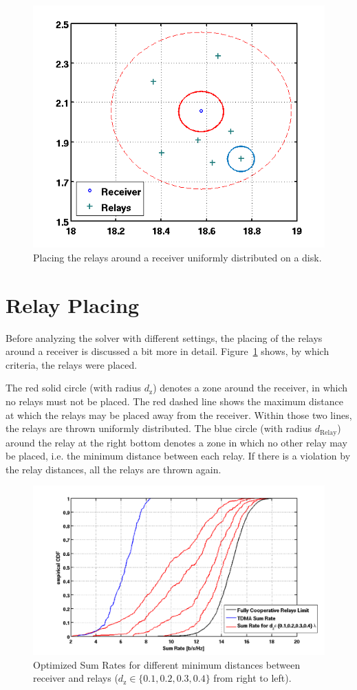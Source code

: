 \begin{figure}[h]
\centering
  \includegraphics[width=0.6\linewidth]{images/cloud.png}
\caption{Placing the relays around a receiver uniformly distributed on a disk.}
\label{fig:cloud}
\end{figure}
\section{Relay Placing}
\label{sec:relay_placing}

Before analyzing the solver with different settings, the placing of the relays around a receiver is discussed a bit more in detail.
Figure~\ref{fig:cloud} shows, by which criteria, the relays were placed.

The red solid circle (with radius $d_\text{z}$) denotes a zone around the receiver, in which no relays must not be placed.
The red dashed line shows the maximum distance at which the relays may be placed away from the receiver. 
Within those two lines, the relays are thrown uniformly distributed.
The blue circle (with radius $d_\text{Relay}$) around the relay at the right bottom denotes a zone in which no other relay may be placed, i.e. the minimum distance between each relay.
If there is a violation by the relay distances, all the relays are thrown again.
\begin{figure}[h]
\centering
  \includegraphics[width=0.8\linewidth]{images/Dzcomparison.png}
\caption{Optimized Sum Rates for different minimum distances between receiver and relays ($d_\text{z}\in\{0.1,0.2,0.3,0.4\}$ from right to left).}
\label{fig:dz_comparison}
\end{figure}

